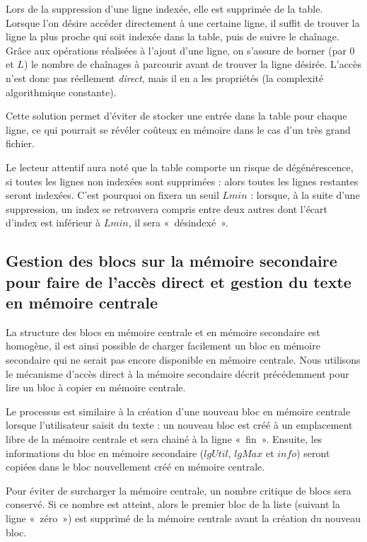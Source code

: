 Lors de la suppression d'une ligne indexée, elle est supprimée de la table.\\

Lorsque l'on désire accéder directement à une certaine ligne, il suffit de trouver la ligne la plus proche qui soit indexée dans la table, puis de suivre le chaînage. Grâce aux opérations réalisées à l'ajout d'une ligne, on s'assure de borner (par $0$ et $L$) le nombre de chaînages à parcourir avant de trouver la ligne désirée. L'accès n'est donc pas réellement \emph{direct}, mais il en a les propriétés (la complexité algorithmique constante).

Cette solution permet d'éviter de stocker une entrée dans la table pour chaque ligne, ce qui pourrait se révéler coûteux en mémoire dans le cas d'un très grand fichier. 

Le lecteur attentif aura noté que la table comporte un risque de dégénérescence, si toutes les lignes non indexées sont supprimées : alors toutes les lignes restantes seront indexées. C'est pourquoi on fixera un seuil $Lmin$ : lorsque, à la suite d'une suppression, un index se retrouvera compris entre deux autres dont l'écart d'index est inférieur à $Lmin$, il sera «~désindexé~». 


\subsection{Gestion des blocs sur la mémoire secondaire pour faire de l'accès
    direct et gestion du texte en mémoire centrale}
	\label{subsec:gestionblocs}

La structure des blocs en mémoire centrale et en mémoire secondaire est
homogène, il est ainsi possible de charger facilement un bloc en mémoire
secondaire qui ne serait pas encore disponible en mémoire centrale. Nous
utilisons le mécanisme d'accès direct à la mémoire secondaire décrit
précédemment pour lire un bloc à copier en mémoire centrale.

Le processus est similaire à la création d'une nouveau bloc en mémoire centrale
lorsque l'utilisateur saisit du texte : un nouveau bloc est créé à un
emplacement libre de la mémoire centrale et sera chainé à la ligne «~fin~».
Ensuite, les informations du bloc en mémoire secondaire ($lgUtil$, $lgMax$ et
$info$) seront copiées dans le bloc nouvellement créé en mémoire centrale.

Pour éviter de surcharger la mémoire centrale, un nombre critique de blocs sera
conservé. Si ce nombre est atteint, alors le premier bloc de la liste (suivant
la ligne «~zéro~») est supprimé de la mémoire centrale avant la création du
nouveau bloc.

